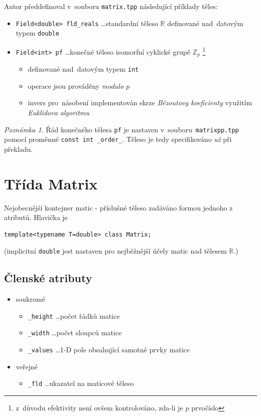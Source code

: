 \documentclass[11pt,a4paper]{article}
\newcommand{\R}{\mathbb{R}}
\theoremstyle{remark}
\newtheorem{note}[thm]{Poznámka}
\begin{document}
Autor předdefinoval v~souboru \verb=matrix.tpp= následující příklady těles:
\begin{itemize}
  \item \verb=Field<double> fld_reals= \ldots standardní těleso $\R$ definované
    nad~datovým typem \verb=double=
  \item \verb=Field<int> pf= \ldots konečné těleso isomorfní cyklické grupě
    $\mathbb{Z}_p$\thinspace%
    \footnote{z~důvodu efektivity není ovšem kontrolováno, zda-li je $p$
    prvočíslo}
    \begin{itemize}
      \item definované nad~datovým typem \verb=int=
      \item operace jsou prováděny \emph{modulo $p$\/}
      \item invers pro~násobení implementován skrze \emph{Bézoutovy
        koeficienty\/} využitím \emph{Euklidova algoritmu\/}
    \end{itemize}
\end{itemize}

\begin{note}
  Řád konečného tělesa \verb=pf= je nastaven v~souboru~\verb=matrixpp.tpp=
  pomocí proměnné \verb=const int _order_=.
  Těleso je tedy specifikováno \emph{už\/} při překladu.
\end{note}

\section{Třída Matrix}

Nejobecnější kontejner matic - příslušné těleso zadáváno formou jednoho z
atributů.
Hlavička je
\begin{verbatim}
template<typename T=double> class Matrix;
\end{verbatim}
(implicitní \verb=double= jest nastaven pro nejběžnější účely matic nad tělesem
$\R$.)

\subsection{Členské atributy}

\begin{itemize}
  \item soukromé
  \begin{itemize}
    \item \verb=_height= \ldots počet řádků matice
    \item \verb=_width= \ldots počet sloupců matice
    \item \verb=_values= \ldots 1-D pole obsahující samotné prvky matice
  \end{itemize}
  \item veřejné
  \begin{itemize}
    \item \verb=_fld= \ldots ukazatel na maticové těleso
  \end{itemize}
\end{itemize}
\end{document}
